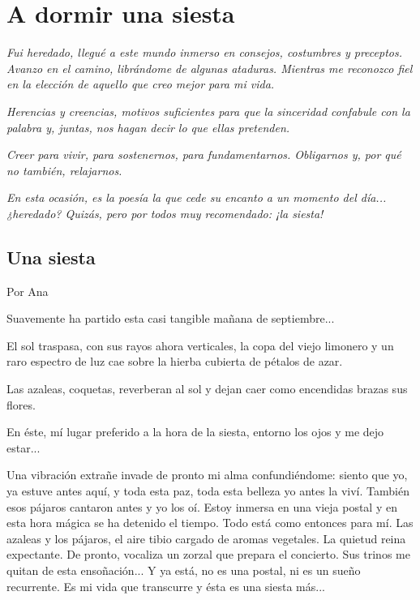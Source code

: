 \documentclass[11pt,twoside,openright,a5paper]{book}
\begin{document}
\chapter*{A dormir una siesta}

\vspace{0.5cm}
\emph{Fui heredado, llegué a este mundo inmerso en consejos, costumbres y preceptos. Avanzo en el camino, librándome de algunas ataduras. Mientras me reconozco fiel en la elección de aquello que creo mejor para mi vida.}

\emph{Herencias y creencias, motivos suficientes para que la sinceridad confabule con la palabra y, juntas, nos hagan decir lo que ellas pretenden.}

\emph{Creer para vivir, para sostenernos, para fundamentarnos. Obligarnos y, por qué no también, relajarnos.}

\emph{En esta ocasión, es la poesía la que cede su encanto a un momento del día... ¿heredado? Quizás, pero por todos muy recomendado: ¡la siesta!}

\section*{Una siesta}
                                                                                                             \begin{flushright}Por Ana\end{flushright}

Suavemente ha partido esta casi tangible mañana de septiembre...

El sol traspasa, con sus rayos ahora verticales, la copa del viejo limonero y un raro espectro de luz cae sobre la hierba cubierta de pétalos de azar.

Las azaleas, coquetas, reverberan al sol y dejan caer como encendidas brazas sus flores.

En éste, mí lugar preferido a la hora de la siesta, entorno los ojos y me dejo estar...

Una vibración extrañe invade de pronto mi alma confundiéndome: siento que yo, ya estuve antes aquí, y toda esta paz, toda esta belleza yo antes la viví. También esos pájaros cantaron antes y yo los oí. Estoy inmersa en una vieja postal y en esta hora mágica se ha detenido el tiempo. Todo está como entonces para mí. Las azaleas y los pájaros, el aire tibio cargado de aromas vegetales. La quietud reina expectante. De pronto, vocaliza un zorzal que prepara el concierto. Sus trinos me quitan de esta ensoñación...
Y ya está, no es una postal, ni es un sueño recurrente. Es mi vida que transcurre y ésta es una siesta más...
\end{document}
